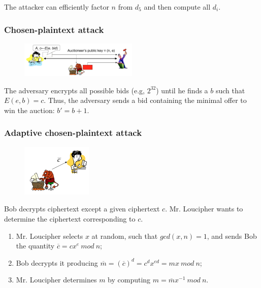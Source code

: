 \documentclass[a4paper,12pt]{article}
\begin{document}
The attacker can efficiently factor $n$ from $d_5$ and then compute all $d_i$.

\subsubsection{Chosen-plaintext attack}

\begin{figure}[H]
  \centering
  \includegraphics[width=0.5\textwidth]{img/chosen-plaintext-attack}
\end{figure}

The adversary encrypts all possible bids (e.g, $2^{32}$) until he finds a $b$ such that $E(e, b) = c$. Thus, the adversary sends a bid containing the minimal offer to win the auction: $b' = b + 1$.

\subsubsection{Adaptive chosen-plaintext attack}

\begin{figure}[H]
  \centering
  \includegraphics[width=0.3\textwidth]{img/chosen-ciphertext-attack}
\end{figure}

Bob decrypts ciphertext except a given ciphertext $c$. Mr. Loucipher wants to determine the ciphertext corresponding to $c$.

\begin{enumerate}
	\item Mr. Loucipher selects $x$ at random, such that $gcd(x, n) = 1$, and sends Bob the quantity $\overline{c} = cx^e\ mod\ n$;
	\item Bob decrypts it producing $\overline{m} = (\overline{c})^d = c^d x^{ed} = mx\ mod\ n$;
	\item Mr. Loucipher determines $m$ by computing $m = \overline{m} x^{-1}\ mod\ n$.
\end{enumerate} 
\end{document}
